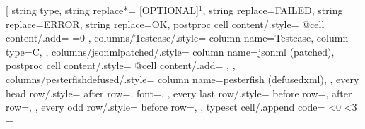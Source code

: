 \usepackage{colortbl}
\usepackage{makecell}
\usepackage{booktabs}
\usepackage{threeparttable}
\usepackage{pifont}
\newcommand{\cmark}{\ding{51}}%
\newcommand{\xmark}{\ding{55}}%
\usepackage[T1]{fontenc}
\usepackage{rubfonts2009}

  \begin{threeparttable}
\pgfplotstabletypeset[
    string type,
    string replace*={ [OPTIONAL]}{$^1$},
    string replace={FAILED}{},
    string replace={ERROR}{\xmark},
    string replace={OK}{\cmark},
    postproc cell content/.style={%
        @cell content/.add={
            \ifnum{}=0
                \color{white}
            \fi
           }{}
    },
    columns/Testcase/.style={
        column name=Testcase,
        column type={C},
    },
    columns/jsonmlpatched/.style={
        column name={jsonml (patched)},
        postproc cell content/.style={%
            @cell content/.add={
               }{}
        },
    },
    columns/pesterfishdefused/.style={
        column name={pesterfish (defusedxml)},
    },
    every head row/.style={
        after row=\toprule,
        font=\selectfont,
    },
    every last row/.style={
        before row=\midrule,
        after row=\bottomrule,
    },
    every odd row/.style={
        before row={},
    },
    typeset cell/.append code={%
        \ifnum\pgfplotstablerow<0%
            \ifnum\pgfplotstablecol<3
            \else
                \ifnum\pgfplotstablecol=\pgfplotstablecols
}
\end{threeparttable}
